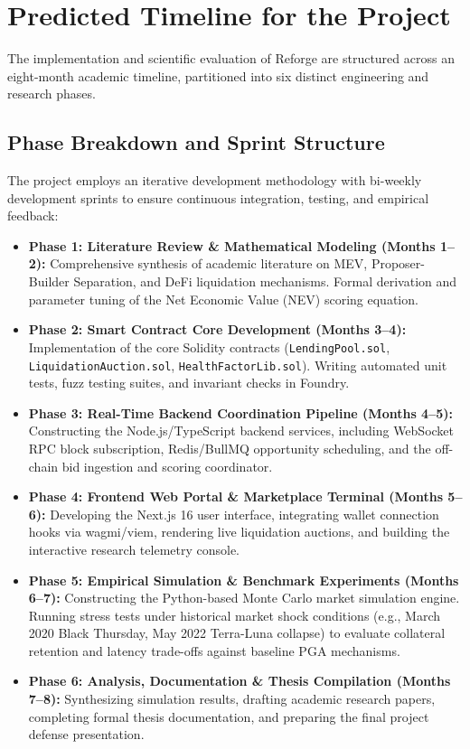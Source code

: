 \chapter{Predicted Timeline for the Project}
\label{chap:timeline}

The implementation and scientific evaluation of Reforge are structured across an eight-month academic timeline, partitioned into six distinct engineering and research phases.

\section{Phase Breakdown and Sprint Structure}
The project employs an iterative development methodology with bi-weekly development sprints to ensure continuous integration, testing, and empirical feedback:

\begin{itemize}
    \item \textbf{Phase 1: Literature Review \& Mathematical Modeling (Months 1--2):}
    Comprehensive synthesis of academic literature on MEV, Proposer-Builder Separation, and DeFi liquidation mechanisms. Formal derivation and parameter tuning of the Net Economic Value (NEV) scoring equation.
    
    \item \textbf{Phase 2: Smart Contract Core Development (Months 3--4):}
    Implementation of the core Solidity contracts (\texttt{LendingPool.sol}, \texttt{LiquidationAuction.sol}, \texttt{HealthFactorLib.sol}). Writing automated unit tests, fuzz testing suites, and invariant checks in Foundry.
    
    \item \textbf{Phase 3: Real-Time Backend Coordination Pipeline (Months 4--5):}
    Constructing the Node.js/TypeScript backend services, including WebSocket RPC block subscription, Redis/BullMQ opportunity scheduling, and the off-chain bid ingestion and scoring coordinator.
    
    \item \textbf{Phase 4: Frontend Web Portal \& Marketplace Terminal (Months 5--6):}
    Developing the Next.js 16 user interface, integrating wallet connection hooks via wagmi/viem, rendering live liquidation auctions, and building the interactive research telemetry console.
    
    \item \textbf{Phase 5: Empirical Simulation \& Benchmark Experiments (Months 6--7):}
    Constructing the Python-based Monte Carlo market simulation engine. Running stress tests under historical market shock conditions (e.g., March 2020 Black Thursday, May 2022 Terra-Luna collapse) to evaluate collateral retention and latency trade-offs against baseline PGA mechanisms.
    
    \item \textbf{Phase 6: Analysis, Documentation \& Thesis Compilation (Months 7--8):}
    Synthesizing simulation results, drafting academic research papers, completing formal thesis documentation, and preparing the final project defense presentation.
\end{itemize}


